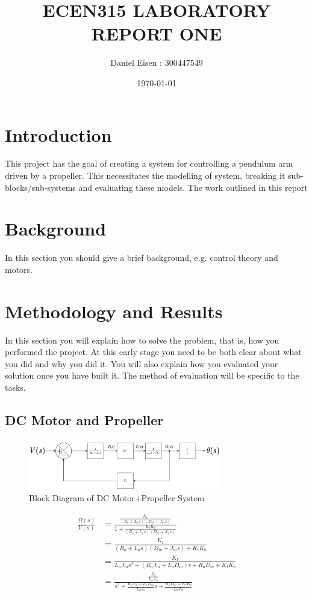 \documentclass[a4paper,11pt]{article}
\title{ECEN315 LABORATORY REPORT ONE}
\author{Daniel Eisen : 300447549}
\date{\today}
\begin{document}
\maketitle
\section{Introduction}
This project has the goal of creating a system for controlling a pendulum arm driven by a propeller. This necessitates the modelling of system, breaking it sub-blocks/sub-systems and evaluating these models. The work outlined in this report

\section{Background}
In this section you should give a brief background, e.g. control theory and motors.
\newpage
\section{Methodology and Results}
In this section you will explain how to solve the problem, that is, how you performed the project. At this early stage you need to be both clear about what you did and why you did it. You will also explain how you evaluated your solution once you have built it. The method of evaluation will be specific to the tasks. 
\subsection{DC Motor and Propeller}
\begin{figure}[h]
        \centering
        \includegraphics[width=0.75\textwidth]{inc/motor_diagram.png}
        \caption{Block Diagram of DC Motor+Propeller System}
        \label{}
\end{figure}

\begin{align*}
        \frac{\Omega(s)}{V(s)} &= \frac{\frac{K_t}{(R_a+L_{a}s)(D_m+J_{m}s)}}{1+\frac{K_tK_b}{(R_a+L_{a}s)(D_m+J_{m}s)}} \\
                               &= \frac{K_t}{(R_a + L_{a}s)(D_m+J_{m}s) + K_tK_b} \\
                               &= \frac{K_t}{L_aJ_{m}s^{2} + (R_{a}J_{m} + L_aD_{m})s + R_{a}D_{m} + K_tK_b } \\
                               &= \frac{\frac{K_t}{L_aJ_m}}{s^2 + \frac{R_{a}J_{m} + L_{a}D_{m}}{L_{a}J_{a}}s + \frac{R_aD_m + K_tK_b}{L_aJ_m}}
\end{align*}
\end{document}
